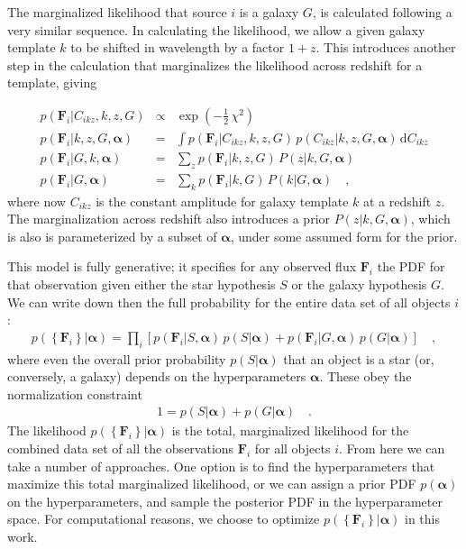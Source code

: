 \documentclass[12pt,preprint]{aastex}
\newcommand{\datavector}[1]{\boldsymbol{#1}}
\newcommand{\flux}{\datavector{F}}
\newcommand{\hyperpars}{\datavector{\alpha}}
\newcommand{\setofall}[1]{\left\{{#1}\right\}}
\newcommand{\allflux}{\setofall{\flux_i}}
\newcommand{\dd}{\mathrm{d}}
\begin{document}
The marginalized likelihood that source $i$ is a galaxy $G$, is calculated 
following a very similar sequence.  In calculating the likelihood, we 
allow a given galaxy template $k$ to be shifted in wavelength by 
a factor $1+z$.  This introduces another step in the calculation that 
marginalizes the likelihood across redshift for a template, giving 

\begin{eqnarray}\displaystyle
\label{eqn:galmarg}
p(\flux_i|C_{ikz},k,z,G) & \propto & \exp(-\frac{1}{2}\,\chi^2)
\nonumber\\
p(\flux_i|k,z,G,\hyperpars) & = & \int p(\flux_i|C_{ikz},k,z,G)\,p(C_{ikz}|k,z,G,
					\hyperpars)\,\dd C_{ikz}
\nonumber\\
p(\flux_i|G,k,\hyperpars) & = & \sum_z p(\flux_i|k,z,G)\,P(z|k,G,\hyperpars)
\nonumber\\
p(\flux_i|G,\hyperpars) & = & \sum_k p(\flux_i|k,G)\,P(k|G,\hyperpars)
\quad ,
\end{eqnarray}
where now $C_{ikz}$ is the constant amplitude for galaxy template $k$
at a redshift $z$.  The marginalization across redshift also introduces 
a prior $P(z|k,G,\hyperpars)$, which is also is parameterized by a subset 
of $\hyperpars$, under some assumed form for the prior.  


This model is fully generative; it specifies for any observed flux
$\flux_i$ the PDF for that observation given either the star
hypothesis $S$ or the galaxy hypothesis $G$.  We can write down then
the full probability for the entire data set of all objects $i$:
\begin{eqnarray}\displaystyle
\label{eqn:fullprob}
p(\allflux|\hyperpars) = \prod_i \left[p(\flux_i|S,\hyperpars)\,p(S|\hyperpars)
                                     + p(\flux_i|G,\hyperpars)\,p(G|\hyperpars)
                                \right]
\quad ,
\end{eqnarray}
where even the overall prior probability $p(S|\hyperpars)$ that an
object is a star (or, conversely, a galaxy) depends on the
hyperparameters $\hyperpars$.  These obey the normalization constraint
\begin{eqnarray}\displaystyle
1 = p(S|\hyperpars) + p(G|\hyperpars)
\quad .
\label{eqn:SGpriorconstraint}
\end{eqnarray}
The likelihood $p(\allflux|\hyperpars)$ is the total, marginalized
likelihood for the combined data set of all the observations $\flux_i$
for all objects $i$.  From here we can take a number of approaches. 
One option is to find the hyperparameters that maximize this total 
marginalized likelihood, or we can assign a prior PDF $p(\hyperpars)$ 
on the hyperparameters, and sample the posterior PDF in the 
hyperparameter space.  For computational reasons, we choose to 
optimize $p(\allflux|\hyperpars)$ in this work.
\end{document}
